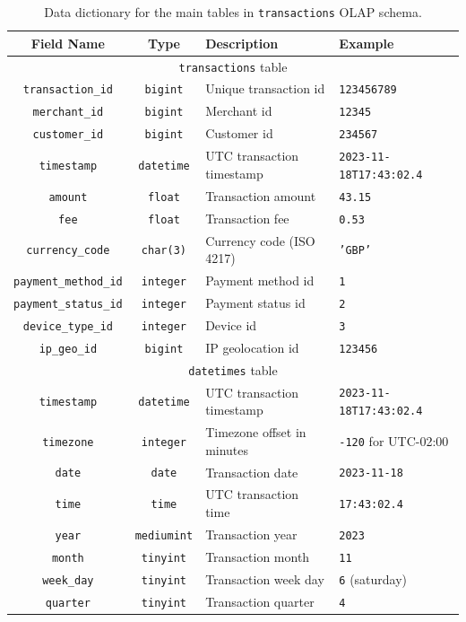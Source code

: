 \documentclass[11pt,a4paper,computermodern]{article}
\newcommand{\code}{\texttt}
\begin{document}
\begin{table}[ht]
	\centering
	\begin{threeparttable}
		\caption{Data dictionary for the main tables in \code{transactions} OLAP schema.}
		\label{table:OLAP_main}
		\begin{tabularx}{0.99\textwidth}{c c >{\centering\arraybackslash}X >{\centering\arraybackslash}X}
			\toprule
			Field Name & Type & Description & Example  \\
			\midrule
			\multicolumn{4}{c}{\code{transactions} table}\\
			\code{transaction\_id} & \code{bigint} & Unique transaction id & \code{123456789} \\
			\code{merchant\_id} & \code{bigint} & Merchant id & \code{12345} \\
			\code{customer\_id} & \code{bigint} & Customer id & \code{234567} \\
			\code{timestamp} & \code{datetime} & UTC transaction timestamp & \code{2023-11-18T17:43:02.4} \\
			\code{amount} & \code{float} & Transaction amount & \code{43.15} \\
			\code{fee} & \code{float} & Transaction fee & \code{0.53} \\
			\code{currency\_code} & \code{char(3)} & Currency code (ISO 4217) & \code{'GBP'} \\
			\code{payment\_method\_id} & \code{integer} & Payment method id & \code{1} \\
			\code{payment\_status\_id} & \code{integer} & Payment status id & \code{2} \\
			\code{device\_type\_id} & \code{integer} & Device id & \code{3} \\
			\code{ip\_geo\_id} & \code{bigint} & IP geolocation id & \code{123456} \\
			
			\midrule
			\multicolumn{4}{c}{\code{datetimes} table}\\
			\code{timestamp} & \code{datetime} & UTC transaction timestamp & \code{2023-11-18T17:43:02.4} \\
			\code{timezone} & \code{integer} & Timezone offset in minutes & \code{-120} for UTC-02:00 \\
			\code{date} & \code{date} & Transaction date & \code{2023-11-18} \\
			\code{time} & \code{time} & UTC transaction time & \code{17:43:02.4} \\
			\code{year} & \code{mediumint} & Transaction year & \code{2023} \\
			\code{month} & \code{tinyint} & Transaction month & \code{11} \\
			\code{week\_day} & \code{tinyint} & Transaction week day & \code{6} (saturday) \\
			\code{quarter} & \code{tinyint} & Transaction quarter & \code{4} \\
			

\end{tabularx}
\end{threeparttable}
\end{table}
\end{document}
